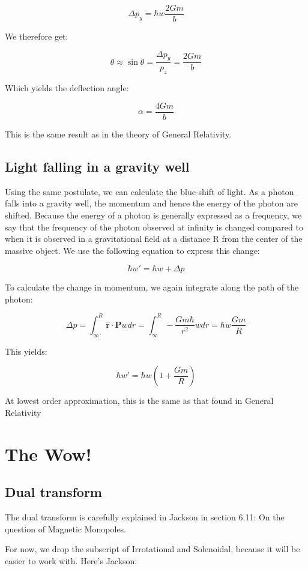 \documentclass {article}
\renewcommand\vec{\mathbf}
\let\OldHat\hat
\renewcommand{\hat}[1]{\OldHat{\mathbf{#1}}}
\begin{document}
$$\Delta p_y = \hbar w \frac {2Gm} b$$

We therefore get:

$$\theta \approx \sin \theta = \frac {\Delta p_y}{p_z} = \frac {2Gm} b$$

Which yields the deflection angle:

$$\alpha = \frac {4Gm} b$$

This is the same result as in the theory of General Relativity.

\newpage
\subsection{Light falling in a gravity well}

Using the same postulate, we can calculate the blue-shift of light. As a photon falls into a gravity well, the momentum and hence the energy of the photon are shifted. Because the energy of a photon is generally expressed as a frequency, we say that the frequency of the photon observed at infinity is changed compared to when it is observed in a gravitational field at a distance R from the center of the massive object. We use the following equation to express this change:

$$\hbar w' = \hbar w + \Delta p $$

To calculate the change in momentum, we again integrate along the path of the photon:

$$\Delta p = \int_{\infty}^R \hat r \cdot \vec P w dr= \int_{\infty}^R - \frac {Gm\hbar}{r^2} w dr = \hbar w \frac {Gm}R $$

This yields:

$$\hbar w' = \hbar w \left( 1 + \frac {Gm}R \right) $$

At lowest order approximation, this is the same as that found in General Relativity

\newpage

\section{The Wow!}
\subsection{Dual transform}

The dual transform is carefully explained in Jackson in section 6.11: On the question of Magnetic Monopoles.

For now, we drop the subscript of Irrotational and Solenoidal, because it will be easier to work with. Here's Jackson:
\end{document}
